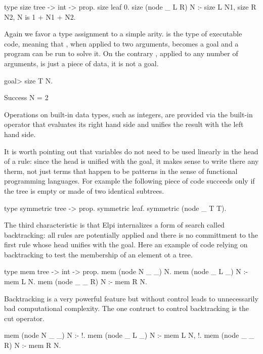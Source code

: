 \documentclass[a4paper, 11pt]{book}
\begin{document}
\begin{elpicode}
type size tree -> int -> prop.
size leaf 0.
size (node _ L R) N :- size L N1, size R N2, N is 1 + N1 + N2.
\end{elpicode}

Again we favor a type assignment to a simple arity.  is the
type of executable code, meaning that , when applied to two
arguments, becomes a goal and a program can be run to solve it.
On the contrary , applied to any number of arguments,
is just a piece of data, it is not a goal.

\begin{elpicode}
goal> size T N.

Success
  N = 2
\end{elpicode}

Operations on built-in data types, such as integers, are provided via
the built-in  operator that evaluates its right hand side
and unifies the result with the left hand side.

It is worth pointing out that variables do not need to be used linearly
in the head of a rule: since the head is unified with the goal, it makes sense to
write there any therm, not just terms that happen to be patterns in
the sense of functional programming languages. For example the following
piece of code succeeds only if the tree is empty or made of two
identical subtrees.

\begin{elpicode}
type symmetric tree -> prop.
symmetric leaf.
symmetric (node _ T T).
\end{elpicode}

The third characteristic is that Elpi internalizes a form of search called
backtracking: all rules are potentially applied and there is no committment to
the first rule whose head unifies with the goal.
Here an example of code relying on backtracking to test
the membership of an element ot a tree.

\begin{elpicode}
type mem tree -> int -> prop.
mem (node N _ _) N.
mem (node _ L _) N :- mem L N.
mem (node _ _ R) N :- mem R N.
\end{elpicode}

Backtracking is a very powerful feature but without control leads to
unnecessarily bad computational complexity. The one contruct to control
backtracking is the cut operator.

\begin{elpicode}
mem (node N _ _) N :- !.
mem (node _ L _) N :- mem L N, !.
mem (node _ _ R) N :- mem R N.
\end{elpicode}  
\end{document}
